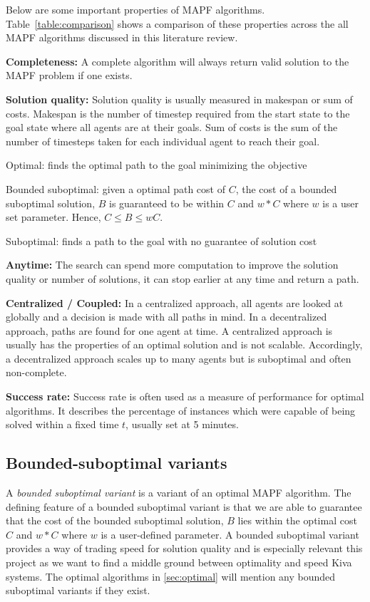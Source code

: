 \documentclass[a4paper,11pt]{article}
\begin{document}
Below are some important properties of MAPF algorithms. Table~\ref{table:comparison} shows a comparison of these properties across the all MAPF algorithms discussed in this literature review.

\noindent \textbf{Completeness:} A complete algorithm will always return valid solution to the MAPF problem if one exists.

\noindent \textbf{Solution quality:} Solution quality is usually measured in makespan or sum of costs. Makespan is the number of timestep required from the start state to the goal state where all agents are at their goals. Sum of costs is the sum of the number of timesteps taken for each individual agent to reach their goal.
\begin{compactitem}
	\item Optimal: finds the optimal path to the goal minimizing the objective
	\item Bounded suboptimal: given a optimal path cost of $C$, the cost of a bounded suboptimal solution, $B$ is guaranteed to be within $C$ and $w*C$ where $w$ is a user set parameter. Hence, $C \le B \le wC$.
	\item Suboptimal: finds a path to the goal with no guarantee of solution cost
\end{compactitem}

\noindent \textbf{Anytime:} The search can spend more computation to improve the solution quality or number of solutions, it can stop earlier at any time and return a path.

\noindent \textbf{Centralized / Coupled:} In a centralized approach, all agents are looked at globally and a decision is made with all paths in mind. In a decentralized approach, paths are found for one agent at time. A centralized approach is usually has the properties of an optimal solution and is not scalable. Accordingly, a decentralized approach scales up to many agents but is suboptimal and often non-complete.

\noindent \textbf{Success rate:} Success rate is often used as a measure of performance for optimal algorithms. It describes the percentage of instances which were capable of being solved within a fixed time $t$, usually set at 5 minutes.

\subsection{Bounded-suboptimal variants} \label{sec:bsov}
A \textit{bounded suboptimal variant} is a variant of an optimal MAPF algorithm. The defining feature of a bounded suboptimal variant is that we are able to guarantee that the cost of the bounded suboptimal solution, $B$ lies within the optimal cost $C$ and $w*C$ where $w$ is a user-defined parameter. A bounded suboptimal variant provides a way of trading speed for solution quality and is especially relevant this project as we want to find a middle ground between optimality and speed Kiva systems. The optimal algorithms in \ref{sec:optimal} will mention any bounded suboptimal variants if they exist.
\end{document}
